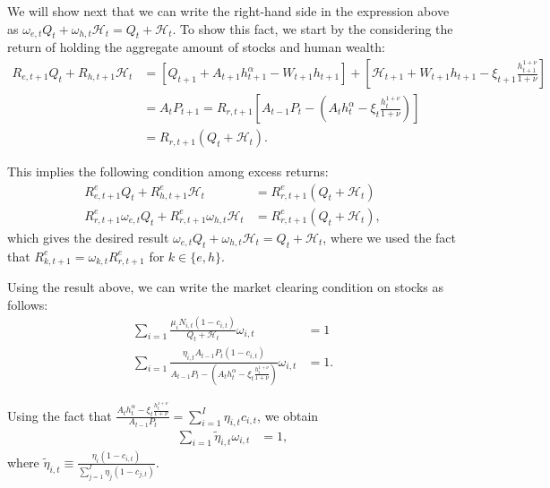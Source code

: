 We will show next that we can write the right-hand side in the expression above as $ \omega_{e,t} Q_{t} + \omega_{h,t} \mathcal{H}_t =  Q_t +\mathcal{H}_t$. 
To show this fact, we start by the considering the return of holding the aggregate amount of stocks and human wealth:\small
\begin{align}
    R_{e,t+1} Q_{t} + R_{h,t+1} \mathcal{H}_t &= \left[Q_{t+1} + A_{t+1} h_{t+1}^\alpha  - W_{t+1} h_{t+1}\right] + \left[ \mathcal{H}_{t+1} + W_{t+1} h_{t+1} - \xi_{t+1} \frac{h_{t+1}^{1+\nu}}{1+\nu}\right] \nonumber\\
    &= A_t P_{t+1} = R_{r,t+1} \left[ A_{t-1} P_{t} - \left( A_t h_t^\alpha - \xi_t \frac{h_t^{1+\nu}}{1+\nu}  \right) \right]\nonumber\\
    &= R_{r,t+1} \left( Q_t + \mathcal{H}_t \right).
\end{align}\normalsize

This implies the following condition among excess returns:
\begin{align}
    R_{e,t+1}^e Q_{t} + R_{h,t+1}^e \mathcal{H}_t &= R_{r,t+1}^e \left( Q_t + \mathcal{H}_t \right)\nonumber\\
    R_{r,t+1}^e \omega_{e,t} Q_{t} + R_{r,t+1}^e \omega_{h,t} \mathcal{H}_t &= R_{r,t+1}^e \left( Q_t + \mathcal{H}_t \right),
\end{align}
which gives the desired result $ \omega_{e,t} Q_{t} + \omega_{h,t} \mathcal{H}_t =  Q_t +\mathcal{H}_t$, where we used the fact that $R_{k,t+1}^e = \omega_{k,t} R_{r,t+1}^e$ for $k \in \{e,h\}$. 

Using the result above, we can write the market clearing condition on stocks as follows:
\begin{align}
    \sum_{i=1} \frac{\mu_i N_{i,t} (1- c_{i,t} )}{Q_t + \mathcal{H}_t} \omega_{i,t}  &= 1\nonumber\\
    \sum_{i=1} \frac{\eta_{i,t} A_{t-1}P_t (1- c_{i,t} )}{A_{t-1} P_t - \left(A_t h_{t}^\alpha - \xi_t \frac{h_t^{1+\nu}}{1+\nu} \right)} \omega_{i,t}  &= 1.
\end{align}
    
Using the fact that $\frac{A_t h_{t}^\alpha - \xi_t \frac{h_t^{1+\nu}}{1+\nu}}{A_{t-1} P_t} = \sum_{i=1}^I \eta_{i,t} c_{i,t}$, we obtain
\begin{align}
    \sum_{i=1} \tilde{\eta}_{i,t} \omega_{i,t}  &= 1,
\end{align}
where $\tilde{\eta}_{i,t} \equiv \frac{\eta_i(1-c_{i,t})}{\sum_{j=1}^I\eta_j(1-c_{j,t})}$.

